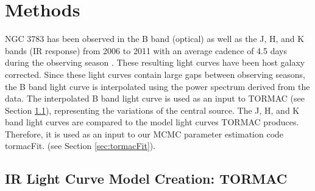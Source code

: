 \graphicspath{{figures/methods}}
\section{Methods} \label{sec:methods}

\par NGC 3783 has been observed in the B band (optical) as well as the J, H, and K bands (IR response) from 2006 to 2011 with an average cadence of 4.5 days during the observing season \citep{lira_optical_2011}.  These resulting light curves have been host galaxy corrected. Since these light curves contain large gaps between observing seasons, the B band light curve is interpolated using the power spectrum derived from the data. The interpolated B band light curve is used as an input to TORMAC (see Section \ref{sec:codereview}), representing the variations of the central source. The J, H, and K band light curves are compared to the model light curves TORMAC produces. Therefore, it is used as an input to our MCMC parameter estimation code tormacFit. (see Section \ref{sec:tormacFit}). 



\subsection{IR Light Curve Model Creation: TORMAC} \label{sec:codereview}


